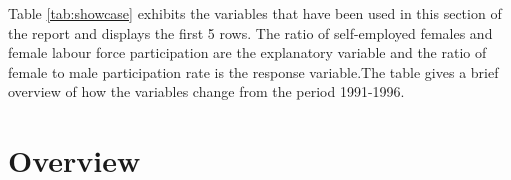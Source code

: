 \documentclass[11pt,a4paper,]{article}
\newenvironment{Shaded}{\begin{snugshade}}{\end{snugshade}}
\newcommand{\DataTypeTok}[1]{\textcolor[rgb]{0.13,0.29,0.53}{#1}}
\newcommand{\DecValTok}[1]{\textcolor[rgb]{0.00,0.00,0.81}{#1}}
\newcommand{\KeywordTok}[1]{\textcolor[rgb]{0.13,0.29,0.53}{\textbf{#1}}}
\newcommand{\NormalTok}[1]{#1}
\newcommand{\OperatorTok}[1]{\textcolor[rgb]{0.81,0.36,0.00}{\textbf{#1}}}
\newcommand{\StringTok}[1]{\textcolor[rgb]{0.31,0.60,0.02}{#1}}
\begin{document}
Table \ref{tab:showcase} exhibits the variables that have been used in this section of the report and displays the first 5 rows. The ratio of self-employed females and female labour force participation are the explanatory variable and the ratio of female to male participation rate is the response variable.The table gives a brief overview of how the variables change from the period 1991-1996.

\begin{Shaded}
\end{Shaded}

\hypertarget{overview}{%
\section{Overview}\label{overview}}

\begin{Shaded}
\end{Shaded}
\end{document}
